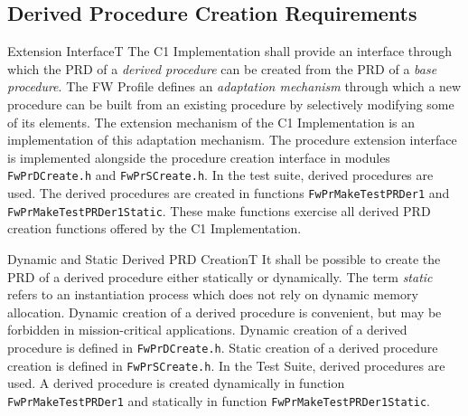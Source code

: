 \documentclass[requirements]{../fwprofile}
\begin{document}
\subsection{Derived Procedure Creation Requirements}

\begin{fw_req}{Extension Interface}{T}
{The C1 Implementation shall provide an interface through which the PRD of a \emph{derived procedure} can be created from the PRD of a \emph{base procedure}.}
{The FW Profile defines an \emph{adaptation mechanism} through which a new procedure can be built 
from an existing procedure by selectively modifying some of its elements. The extension mechanism of the C1 Implementation is an 
implementation of this adaptation mechanism.}
{The procedure extension interface is implemented alongside the procedure creation interface in 
modules \texttt{FwPrDCreate.h} and \texttt{FwPrSCreate.h}.} 
{In the test suite, derived procedures are used. The derived procedures are created in functions 
\texttt{FwPrMakeTestPRDer1} and \texttt{FwPrMakeTestPRDer1Static}. These make functions exercise all derived PRD creation functions offered 
by the C1 Implementation.}
\end{fw_req}


\begin{fw_req_note}{Dynamic and Static Derived PRD Creation}{T}
{It shall be possible to create the PRD of a derived procedure either statically or dynamically.}
{The term \emph{static} refers to an instantiation process which does not rely on dynamic memory
allocation.}
{Dynamic creation of a derived procedure is convenient, but may be forbidden in mission-critical applications.}
{Dynamic creation of a derived procedure is defined in \texttt{FwPrDCreate.h}. 
Static creation of a derived procedure creation is defined in \texttt{FwPrSCreate.h}.} 
{In the Test Suite, derived procedures are used. A derived procedure is created dynamically in 
function \texttt{FwPrMakeTestPRDer1} and statically in function \texttt{FwPrMakeTestPRDer1Static}.}
\end{fw_req_note}
\end{document}
